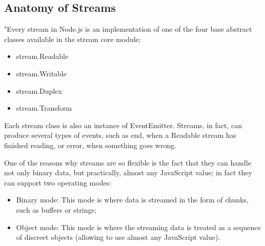 
\subsection{Anatomy of Streams}
"Every stream in Node.js is an implementation of one of the four base abstract classes available in the stream core module:

\begin{itemize}
\item stream.Readable
\item stream.Writable
\item stream.Duplex
\item stream.Transform
\end{itemize}

Each stream class is also an instance of EventEmitter. 
Streams, in fact, can produce several types of events, such as end, when a Readable stream has finished reading, or error, when something goes wrong.

One of the reasons why streams are so flexible is the fact that they can handle not only binary data, but practically, almost any JavaScript value; in fact they can support two operating modes:
\begin{itemize}
\item Binary mode: This mode is where data is streamed in the form of chunks, such as buffers or strings;
\item Object mode: This mode is where the streaming data is treated as a sequence of discreet objects (allowing to use almost any JavaScript value).
\end{itemize}

